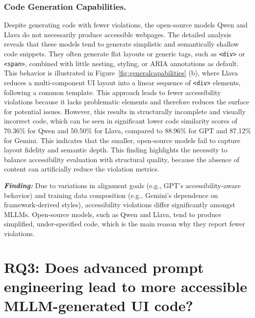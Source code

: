 \subsubsection{Code Generation Capabilities.} Despite generating
code with fewer violations, the open-source models Qwen and 
Llava do not necessarily produce accessible webpages.
The detailed analysis reveals that these models tend to generate 
simplistic and semantically shallow code snippets. They often 
generate flat layouts or generic tags, such as \texttt{<div>} or \texttt{<span>},
combined with little nesting, styling, or ARIA annotations as default. 
This behavior is illustrated in Figure~\ref{fig:generalcapabilities} (b),
where Llava reduces a multi-component UI layout into a linear 
sequence of \texttt{<div>} elements, following a common template.
This approach leads to fewer accessibility violations
because it lacks problematic elements and therefore reduces the 
surface for potential issues. However, this results in 
structurally incomplete and visually incorrect code, which can be 
seen in significant lower code similarity scores of 70.36\% for Qwen and
50.50\% for Llava, compared to 88.96\% for GPT and 87.12\% for Gemini.
This indicates that the smaller, open-source models fail to capture 
layout fidelity and semantic depth. This finding highlights the 
necessity to balance accessibility evaluation with structural 
quality, because the absence of content can artificially 
reduce the violation metrics.

\begin{center}
\begin{tcolorbox}[colback=black!5!white,colframe=black!75!black,bottom=-0.05pt,top=-0.05pt]
\textit{\textbf{Finding:}} Due to variations in alignment goals (e.g., GPT's accessibility-aware behavior) and training data composition (e.g., Gemini's dependence on framework-derived styles), accessibility violations differ significantly amongst MLLMs. Open-source models, such as Qwen and Llava, tend to produce simplified, under-specified code, which is the main reason why they report fewer violations.
\end{tcolorbox}
\end{center}


\section{RQ3: Does advanced prompt engineering lead to more accessible MLLM-generated
UI code?}
